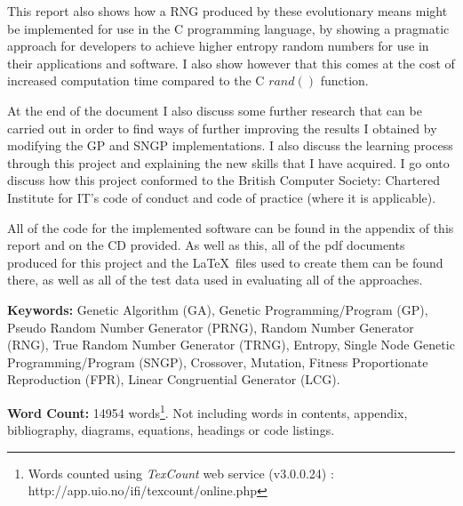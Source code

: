 \documentclass[a4paper,10.5pt]{article}
\begin{document}
This report also shows how a RNG produced by these evolutionary means might be implemented for use in the C programming language, by showing a pragmatic approach for developers to achieve higher entropy random numbers for use in their applications and software. I also show however that this comes at the cost of increased computation time compared to the C $rand()$ function.

At the end of the document I also discuss some further research that can be carried out in order to find ways of further improving the results I obtained by modifying the GP and SNGP implementations. I also discuss the learning process through this project and explaining the new skills that I have acquired. I go onto discuss how this project conformed to the British Computer Society: Chartered Institute for IT's code of conduct and code of practice (where it is applicable).

All of the code for the implemented software can be found in the appendix of this report and on the CD provided. As well as this, all of the pdf documents produced for this project and the \LaTeX\ files used to create them can be found there, as well as all of the test data used in evaluating all of the approaches.
\newline

\noindent \textbf{Keywords:} Genetic Algorithm (GA), Genetic Programming/Program (GP), Pseudo Random Number Generator (PRNG), Random Number Generator (RNG), True Random Number Generator (TRNG), Entropy, Single Node Genetic Programming/Program (SNGP), Crossover, Mutation, Fitness Proportionate Reproduction (FPR), Linear Congruential Generator (LCG).\newline

\noindent \textbf{Word Count:} 14954 words\footnote{Words counted using \emph{TexCount} web service (v3.0.0.24) : http://app.uio.no/ifi/texcount/online.php}. Not including words in contents, appendix, bibliography, diagrams, equations, headings or code listings.
\newpage

\newpage
\end{document}
